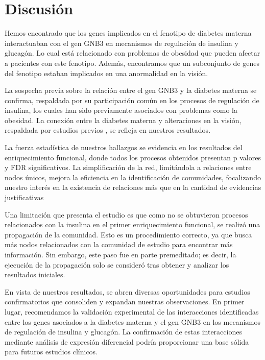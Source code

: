 \section{Discusión}
Hemos encontrado que los genes implicados en el fenotipo de diabetes materna interactuaban con el gen GNB3 en mecanismos de regulación de insulina y glucagón. Lo cual está relacionado con problemas de obesidad que pueden afectar a pacientes con este fenotipo. Además, encontramos que un subconjunto de genes del fenotipo estaban implicados en una anormalidad en la visión.

La sospecha previa sobre la relación entre el gen GNB3 y la diabetes materna se confirma, respaldada por su participación común en los procesos de regulación de insulina\cite{Rodolaki2023, Feng2019}, los cuales han sido previamente asociados con problemas como la obesidad\cite{Shah2011}. La conexión entre la diabetes materna y alteraciones en la visión, respaldada por estudios previos \cite{Nelson1986}, se refleja en nuestros resultados.

La fuerza estadística de nuestros hallazgos se evidencia en los resultados del enriquecimiento funcional, donde todos los procesos obtenidos presentan p valores y FDR significativos. La simplificación de la red, limitándola a relaciones entre nodos únicos, mejora la eficiencia en la identificación de comunidades, focalizando nuestro interés en la existencia de relaciones más que en la cantidad de evidencias justificativas

Una limitación que presenta el estudio es que como no se obtuvieron procesos relacionados con la insulina en el primer enriquecimiento funcional, se realizó una propagación de la comunidad. Esto es un procedimiento correcto, ya que busca más nodos relacionados con la comunidad de estudio para encontrar más información. Sin embargo, este paso fue en parte premeditado; es decir, la ejecución de la propagación solo se consideró tras obtener y analizar los resultados iniciales.

En vista de nuestros resultados, se abren diversas oportunidades para estudios confirmatorios que consoliden y expandan nuestras observaciones. En primer lugar, recomendamos la validación experimental de las interacciones identificadas entre los genes asociados a la diabetes materna y el gen GNB3 en los mecanismos de regulación de insulina y glucagón. La confirmación de estas interacciones mediante análisis de expresión diferencial\cite{Haynes2013} podría proporcionar una base sólida para futuros estudios clínicos.

